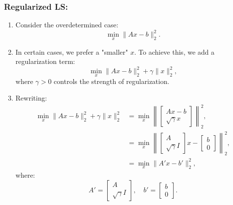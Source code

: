 \subsubsection{Regularized LS:}
\begin{example}
    \begin{enumerate}
        \item Consider the overdetermined case:
        \[
        \min_x \|Ax - b\|_2^2.
        \]
        
        \item In certain cases, we prefer a "smaller" \(x\). To achieve this, we add a regularization term:
        \[
        \min_x \|Ax - b\|_2^2 + \gamma \|x\|_2^2,
        \]
        where \(\gamma > 0\) controls the strength of regularization.
        
        \item Rewriting:
        \begin{align*}
        \min_x \|Ax - b\|_2^2 + \gamma \|x\|_2^2 
        &= \min_x \left\|
            \begin{bmatrix}
            A x - b\\ 
            \sqrt{\gamma} x
            \end{bmatrix}
            \right\|_2^2, \\
        &= \min_x \left\|
        \begin{bmatrix}
        A \\ 
        \sqrt{\gamma} I
        \end{bmatrix}
        x - 
        \begin{bmatrix}
        b \\ 
        0
        \end{bmatrix}
        \right\|_2^2, \\
        &= \min_x \|A'x - b'\|_2^2,
        \end{align*}
        where:
        \[
        A' = 
        \begin{bmatrix}
        A \\ 
        \sqrt{\gamma} I
        \end{bmatrix},
        \quad 
        b' = 
        \begin{bmatrix}
        b \\ 
        0
        \end{bmatrix}.
        \]
        

\end{enumerate}
\end{example}

